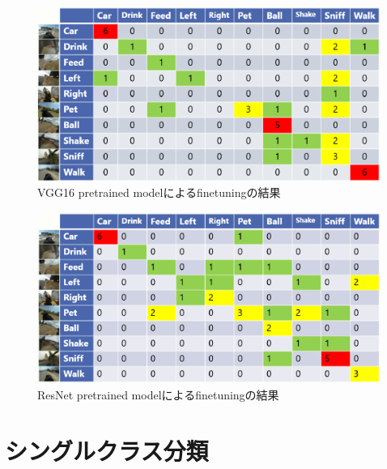 \begin{figure}[htbp]
   \begin{center}
    
    \includegraphics[scale=0.3]{./Figures/vgg16_res.eps}
    \caption{VGG16 pretrained modelによるfinetuningの結果}
    \label{vgg16_res}
   \end{center}
\end{figure}
\begin{figure}[htbp]

   \begin{center}

    \includegraphics[scale=0.3]{./Figures/resnet_res.eps}
  \caption{ResNet pretrained modelによるfinetuningの結果}
  \label{resnet_res}
   \end{center}
\end{figure}
\section{シングルクラス分類}
